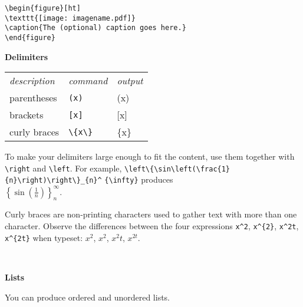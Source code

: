 \documentclass[10pt,landscape]{article}
\newcommand{\ColorSection}[1]{\par\vspace{1.5ex}\noindent\textcolor{sectioncolor}{\Large\bfseries #1}\par\vspace{0.75ex}}
\begin{document}
\begin{multicols}{3}
\verb!\begin{figure}[ht]!\\
\verb!\texttt{[image: imagename.pdf]}!\\
\verb!\caption{The (optional) caption goes here.}!\\
\verb!\end{figure}!



\ColorSection{Delimiters}

\begin{tabular}{lll}
\emph{description} & \emph{command} & \emph{output}\\
parentheses &\verb!(x)! & (x)\\
brackets &\verb![x]! & [x]\\
curly braces& \verb!\{x\}! & \{x\}\\
\end{tabular}

To make your delimiters large enough to fit the content, use them together with \verb!\right! and \verb!\left!. For example, \verb!\left\{\sin\left(\frac{1}{n}\right)\right\}_{n}^! \verb!{\infty}! produces\\ $\displaystyle \left\{\sin\left(\frac{1}{n}\right)\right\}_{n}^{\infty}$.

Curly braces are non-printing characters used to gather text with more than one character. Observe the differences between the four expressions \verb!x^2!, \verb!x^{2}!, \verb!x^2t!, \verb!x^{2t}! when typeset: $x^2$, $x^{2}$, $x^2t$, $x^{2t}$.

\vfill
~
\columnbreak
\ColorSection{Lists}

You can produce ordered and unordered lists.


\end{multicols}
\end{document}
